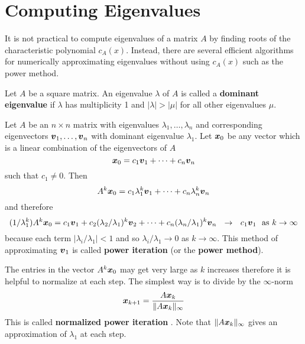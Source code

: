 \section{Computing Eigenvalues}

\begin{bigidea}
It is not practical to compute eigenvalues of a matrix $A$ by finding roots of the characteristic polynomial $c_A(x)$. Instead, there are several efficient algorithms for numerically approximating eigenvalues without using $c_A(x)$ such as the power method.
\end{bigidea}

\begin{definition}
Let $A$ be a square matrix. An eigenvalue $\lambda$ of $A$ is called a {\bf dominant eigenvalue} \cite[p.441]{KN} if $\lambda$ has multiplicity 1 and $| \lambda | > | \mu |$ for all other eigenvalues $\mu$.
\end{definition}

\begin{definition}
Let $A$ be an $n \times n$ matrix with eigenvalues $\lambda_1,\dots,\lambda_n$ and corresponding eigenvectors $\boldsymbol{v}_1,\dots,\boldsymbol{v}_n$ with dominant eigenvalue $\lambda_1$. Let $\boldsymbol{x}_0$ be any vector which is a linear combination of the eigenvectors of $A$
$$
\boldsymbol{x}_0 = c_1 \boldsymbol{v}_1 + \cdots + c_n \boldsymbol{v}_n
$$
such that $c_1 \not= 0$. Then
$$
A^k \boldsymbol{x}_0 = c_1 \lambda_1^k \boldsymbol{v}_1 + \cdots + c_n \lambda_n^k \boldsymbol{v}_n
$$
and therefore
$$
(1/\lambda_1^k)A^k \boldsymbol{x}_0 = c_1 \boldsymbol{v}_1 + c_2 (\lambda_2/\lambda_1)^k \boldsymbol{v}_2 + \cdots + c_n (\lambda_n/\lambda_1)^k \boldsymbol{v}_n
\ \ \rightarrow \ \ c_1 \boldsymbol{v}_1 \ \ \text{as } k \to \infty
$$
because each term $| \lambda_i/\lambda_1 | < 1$ and so $\lambda_i/\lambda_1 \to 0$ as $k \to \infty$. This method of approximating $\boldsymbol{v}_1$ is called {\bf power iteration} \cite[p.172]{MH} (or the {\bf power method}).
\end{definition}

\begin{note}
The entries in the vector $A^k \boldsymbol{x}_0$ may get very large as $k$ increases therefore it is helpful to normalize at each step. The simplest way is to divide by the $\infty$-norm
$$
\boldsymbol{x}_{k+1} = \frac{A \boldsymbol{x}_k}{\| A \boldsymbol{x}_k \|_{\infty}}
$$
This is called {\bf normalized power iteration} \cite[p.174]{MH}. Note that $\| A \boldsymbol{x}_k \|_{\infty}$ gives an approximation of $\lambda_1$ at each step.
\end{note}

